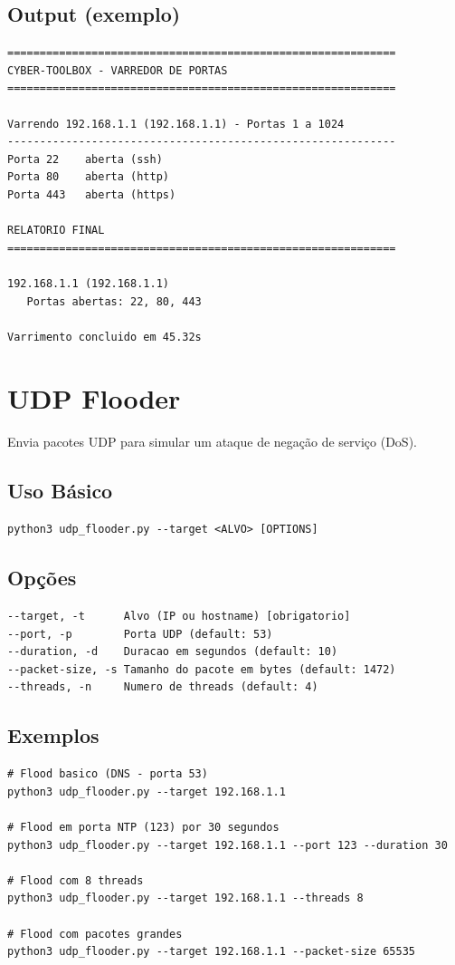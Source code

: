 \documentclass[11pt,a4paper]{article}
\begin{document}
\subsection{Output (exemplo)}
\begin{lstlisting}[style=bash]
============================================================
CYBER-TOOLBOX - VARREDOR DE PORTAS
============================================================

Varrendo 192.168.1.1 (192.168.1.1) - Portas 1 a 1024
------------------------------------------------------------
Porta 22    aberta (ssh)
Porta 80    aberta (http)
Porta 443   aberta (https)

RELATORIO FINAL
============================================================

192.168.1.1 (192.168.1.1)
   Portas abertas: 22, 80, 443

Varrimento concluido em 45.32s
\end{lstlisting}

\section{UDP Flooder}
Envia pacotes UDP para simular um ataque de nega\c{c}\~ao de servi\c{c}o (DoS).

\subsection{Uso B\'asico}
\begin{lstlisting}[style=bash]
python3 udp_flooder.py --target <ALVO> [OPTIONS]
\end{lstlisting}

\subsection{Op\c{c}\~oes}
\begin{lstlisting}[style=bash]
--target, -t      Alvo (IP ou hostname) [obrigatorio]
--port, -p        Porta UDP (default: 53)
--duration, -d    Duracao em segundos (default: 10)
--packet-size, -s Tamanho do pacote em bytes (default: 1472)
--threads, -n     Numero de threads (default: 4)
\end{lstlisting}

\subsection{Exemplos}
\begin{lstlisting}[style=bash]
# Flood basico (DNS - porta 53)
python3 udp_flooder.py --target 192.168.1.1

# Flood em porta NTP (123) por 30 segundos
python3 udp_flooder.py --target 192.168.1.1 --port 123 --duration 30

# Flood com 8 threads
python3 udp_flooder.py --target 192.168.1.1 --threads 8

# Flood com pacotes grandes
python3 udp_flooder.py --target 192.168.1.1 --packet-size 65535
\end{lstlisting}
\end{document}
